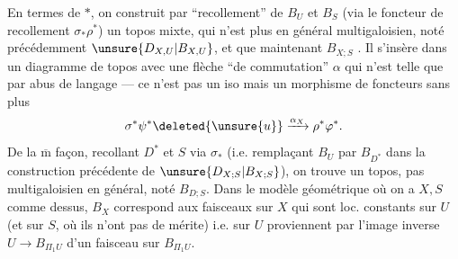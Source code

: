 En termes de $*$, on construit par ``recollement'' de $B_U$ et  $B_S$ (via le foncteur de recollement $\sigma_*\rho^*$) un topos mixte, qui n'est plus en général multigaloisien, noté précédemment $\unsure{D_{X,U}|B_{X,U}}$, et que  maintenant   $B_{X;S}$   . Il s'insère dans un diagramme de topos
avec une flèche
``de commutation'' $\alpha$ qui n'est telle que par abus de langage --- ce n'est pas un iso  mais un morphisme de foncteurs sans plus
\[
 \sigma^*\psi^*\deleted{\unsure{u}}\xrightarrow{\alpha_X}\rho^*\varphi^*.
\]
De la $\overline{\mathrm m}$ façon, recollant $D^*$ et $S$ via $\sigma_*$ (i.e. remplaçant $B_U$ par $B_{D^*}$ dans la construction précédente de $\unsure{D_{X;S}|B_{X;S}}$), on trouve un topos, pas multigaloisien en général, noté $B_{D;S}$. Dans le  modèle géométrique où on a $X,S$ comme dessus,
$B_X$ correspond aux faisceaux sur $X$ qui sont  loc. constants sur $U$ (et sur $S$, où ils n'ont pas de mérite) i.e. sur $U$ proviennent par l'image inverse   $U\longrightarrow B_{\Pi_1 U}$ d'un faisceau sur $B_{\Pi_1 U}$.


